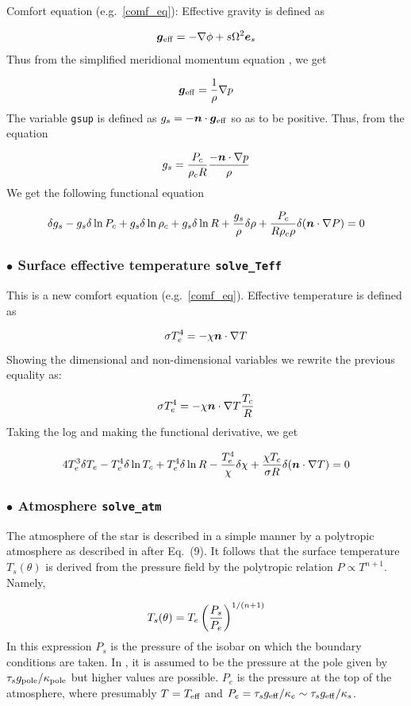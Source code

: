 Comfort equation (e.g.~\ref{comf_eq}): Effective gravity is defined as

\[ \vg_{\rm eff} = -\nabla\phi+s\Omega^2\es\]
Thus from the simplified meridional momentum equation , we get

\[ \vg_{\rm eff} = \frac{1}{\rho}\nabla p\]
The variable {\tt gsup} is defined as $g_s=-\vn\cdot\vg_{\rm eff}$
so as to be positive. Thus, from the equation

\[ g_s=\frac{P_c}{\rho_cR}\frac{-\vn\cdot\nabla p}{\rho}\]
We get the following functional equation

\begin{equation}
\delta g_s -g_s\delta\ln P_c +g_s\delta\ln\rho_c+g_s\delta\ln R + \frac{g_s}{\rho}\delta\rho+
\frac{P_c}{R\rho_c\rho}\delta(\vn\cdot\nabla P) = 0
\end{equation}

\subsubsection{$\bullet$ \bf Surface effective temperature {\tt solve\_Teff}}

This is a new comfort equation (e.g.~\ref{comf_eq}). Effective temperature is defined as

\[ \sigma T_e^4 = -\khi\vn\cdot\na T\]
Showing the dimensional and non-dimensional variables we rewrite the
previous equality as:

\[ \sigma T_e^4 = -\khi\vn\cdot\na T \frac{T_c}{R}\]
Taking the log and making the functional derivative, we get

\begin{equation}
4T_e^3\delta T_e -T_e^4\delta\ln T_c + T_e^4\delta\ln R -\frac{T_e^4}{\khi}\delta\khi + \frac{\khi T_c}{\sigma
R}\delta(\vn\cdot\nabla T) = 0
\end{equation}

\subsubsection{$\bullet$ \bf Atmosphere {\tt solve\_atm}}

The atmosphere of the star is described in a simple manner by a polytropic
atmosphere as described in \cite{ELR13} after Eq.~(9). It follows that
the surface temperature $T_s(\theta)$ is derived from the pressure field
by the polytropic relation $P\propto T^{n+1}$. Namely,

\begin{equation}
T_s(\theta) = T_e\left(\frac{P_s}{P_e}\right)^{1/(n+1)}
\label{atm_poly}
\end{equation}
In this expression $P_s$ is the pressure of the isobar on which the
boundary conditions are taken. In \cite{ELR13}, it is assumed to be the
pressure at the pole given by $\tau_sg_{\rm pole}/\kappa_{\rm pole}$
but higher values are possible. $P_e$ is the pressure at the top of
the atmosphere, where presumably $T=T_{\rm eff}$ and $P_e=\tau_sg_{\rm
eff}/\kappa_e\sim\tau_sg_{\rm eff}/\kappa_s$.

